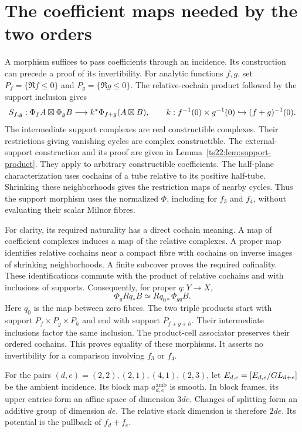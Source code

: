 \section{The coefficient maps needed by the two orders}
\label{fl221:sec:coefficient}

A morphism suffices to pass coefficients through an incidence.
Its construction can precede a proof of its invertibility.
For analytic functions $f,g$, set
$P_f=\{\Re f\le0\}$ and $P_g=\{\Re g\le0\}$.
The relative-cochain product followed by the support inclusion gives
\[
 S_{f,g}:\Phi_fA\boxtimes\Phi_gB
 \longrightarrow k^*\Phi_{f+g}(A\boxtimes B),\qquad
 k:f^{-1}(0)\times g^{-1}(0)\hookrightarrow(f+g)^{-1}(0).
\]
The intermediate support complexes are real constructible complexes.
Their restrictions giving vanishing cycles are complex constructible.
The external-support construction and its proof are given in
Lemma~\ref{ts22:lem:support-product}. They apply to arbitrary
constructible coefficients. The half-plane characterization uses
cochains of a tube relative to its positive half-tube. Shrinking
these neighborhoods gives the restriction maps of nearby cycles.
Thus the support morphism uses the normalized $\Phi$, including
for $f_3$ and $f_4$, without evaluating their scalar Milnor fibres.

For clarity, its required naturality has a direct cochain meaning.
A map of coefficient complexes induces a map of the relative
complexes. A proper map identifies relative cochains near a compact
fibre with cochains on inverse images of shrinking neighborhoods.
A finite subcover proves the required cofinality. These identifications
commute with the product of relative cochains and with inclusions
of supports. Consequently, for proper $q:Y\to X$,
\[
 \Phi_gRq_*B\simeq Rq_{0*}\Phi_{gq}B.
\]
Here $q_0$ is the map between zero fibres.
The two triple products start with support
$P_f\times P_g\times P_h$ and end with support $P_{f+g+h}$.
Their intermediate inclusions factor the same inclusion.
The product-cell associator preserves their ordered cochains.
This proves equality of these morphisms. It asserts no invertibility
for a comparison involving $f_3$ or $f_4$.

For the pairs $(d,e)=(2,2),(2,1),(4,1),(2,3)$, let
$E_{d,e}=[E_{d,e}/GL_{d+e}]$ be the ambient incidence.
Its block map $a^{\mathrm{amb}}_{d,e}$ is smooth. In block frames,
its upper entries form an affine space of dimension $3de$.
Changes of splitting form an additive group of dimension $de$.
The relative stack dimension is therefore $2de$. Its potential is
the pullback of $f_d+f_e$.

